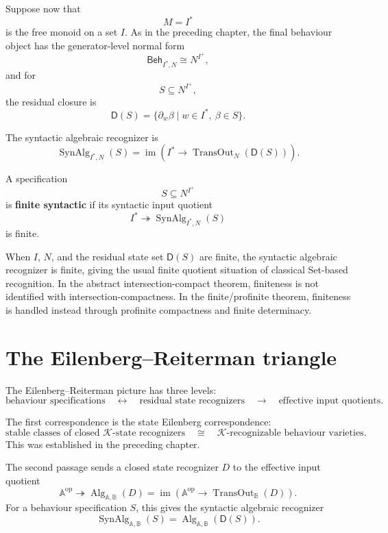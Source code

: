 Suppose now that
\[
M=I^\ast
\]
is the free monoid on a set \(I\). As in the preceding chapter, the final
behaviour object has the generator-level normal form
\[
\mathsf{Beh}_{I^\ast,N}
\cong
N^{I^+},
\]
and for
\[
S\subseteq N^{I^+},
\]
the residual closure is
\[
\mathsf D(S)
=
\{\partial_w\beta\mid w\in I^\ast,\ \beta\in S\}.
\]

The syntactic algebraic recognizer is
\[
\operatorname{SynAlg}_{I^\ast,N}(S)
=
\operatorname{im}
\left(
I^\ast
\to
\operatorname{TransOut}_N(\mathsf D(S))
\right).
\]

\begin{definition}
\label{def:reiterman-finite-syntactic-specification}
A specification
\[
S\subseteq N^{I^+}
\]
is \textbf{finite syntactic} if its syntactic input quotient
\[
I^\ast
\twoheadrightarrow
\operatorname{SynAlg}_{I^\ast,N}(S)
\]
is finite.
\end{definition}

\begin{remark}
\label{rem:reiterman-finite-state-special-case}
When \(I\), \(N\), and the residual state set \(\mathsf D(S)\) are finite,
the syntactic algebraic recognizer is finite, giving the usual finite
quotient situation of classical Set-based recognition. In the abstract
intersection-compact theorem, finiteness is not identified with
intersection-compactness. In the finite/profinite theorem, finiteness is
handled instead through profinite compactness and finite determinacy.
\end{remark}

\section{The Eilenberg--Reiterman triangle}
\label{sec:reiterman-triangle}

The Eilenberg--Reiterman picture has three levels:
\[
\text{behaviour specifications}
\quad\longleftrightarrow\quad
\text{residual state recognizers}
\quad\longrightarrow\quad
\text{effective input quotients}.
\]

The first correspondence is the state Eilenberg correspondence:
\[
\text{stable classes of closed \(\mathcal K\)-state recognizers}
\quad\cong\quad
\text{\(\mathcal K\)-recognizable behaviour varieties}.
\]
This was established in the preceding chapter.

The second passage sends a closed state recognizer \(D\) to the effective
input quotient
\[
\mathbb A^{\mathrm{op}}
\twoheadrightarrow
\operatorname{Alg}_{\mathbb A,\mathbb B}(D)
=
\operatorname{im}
\left(
\mathbb A^{\mathrm{op}}
\to
\operatorname{TransOut}_{\mathbb B}(D)
\right).
\]
For a behaviour specification \(S\), this gives the syntactic algebraic
recognizer
\[
\operatorname{SynAlg}_{\mathbb A,\mathbb B}(S)
=
\operatorname{Alg}_{\mathbb A,\mathbb B}(\mathsf D(S)).
\]


